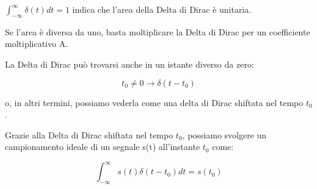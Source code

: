 $\int_{- \infty}^{ \infty} \delta (t) dt = 1$ indica che l'area della Delta di Dirac è unitaria. \newline 

Se l'area è diversa da uno, basta moltiplicare la Delta di Dirac per un coefficiente moltiplicativo A. \newline 

La Delta di Dirac può trovarsi anche in un istante diverso da zero: 

{
    \Large 
    \begin{equation}
        t_0 \not = 0 
        \rightarrow 
        \delta (t - t_0)
     \end{equation}
}

o, in altri termini, possiamo vederla come una delta di Dirac shiftata nel tempo $t_0$. \newline 

Grazie alla Delta di Dirac shiftata nel tempo $t_0$, possiamo svolgere un campionamento ideale di un segnale s(t) all'instante $t_0$ come: 

{
    \Large 
    \begin{equation}
        \int_{- \infty}^{\infty} 
        s(t) \delta (t - t_0) dt 
        = 
        s(t_0)
    \end{equation}
}